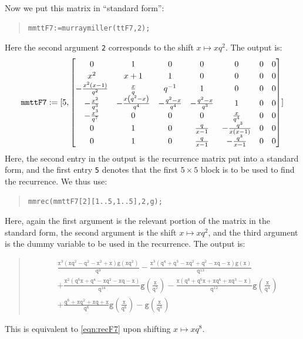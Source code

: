\documentclass[ALCO,Unicode,published]{cedram}
\begin{document}
Now we put this matrix in ``standard form'':
\begin{quote}
\begin{verbatim}
mmttF7:=murraymiller(ttF7,2);
\end{verbatim}
\end{quote}
Here the second argument \texttt{2} corresponds to the shift $x\mapsto xq^2$.
The output is:
\begin{align*}
\mathtt{mmttF7}:=
[5, 
{\renewcommand{\arraystretch}{1.2}
\begin{bmatrix} 
0&1&0&0&0&0&0\\ 
{x}^{2}&x+1&1&0&0&0&0\\ 
-{\frac {{x}^{2} \left( x-1 \right) }{{q}^{2}}}&{\frac {x}{q}}&{q}^{-1}&1&0&0&0\\ 
-{\frac {{x}^{2}}{{q}^{3}}}&-{\frac {x \left( {q}^{2}-x \right) }{{q}^{4}}}&-{\frac {{q}^{2}-x}{{q}^{4}}}&-{\frac {{q}^{2}-x}{{q}^{3}}}&1&0&0\\
-{\frac {{x}^{3}}{{q}^{7}}}&0&0&0&{\frac {x}{{q}^{4}}}&0&0\\ 
0&1&0&{\frac {q}{x-1}}&-{\frac {{q}^{3}}{x \left( x-1 \right) }}&0&0\\
0&1&0&{\frac {q}{x-1}}&-{\frac {{q}^{3}}{x-1}}&0&0
\end{bmatrix}
]
}
\end{align*}
Here, the second entry in the output is the recurrence matrix put into a standard form, 
and the first entry \texttt{5} denotes that the first $5\times 5$ block is 
to be used to find the recurrence.
We thus use:
\begin{quote}
\begin{verbatim}
mmrec(mmttF7[2][1..5,1..5],2,g);
\end{verbatim}
\end{quote}
Here, again the first argument is the relevant portion of the matrix in the standard form, the second argument is the shift $x\mapsto xq^2$,
and the third argument is the dummy variable to be used in the recurrence.
The output is:
\begin{quote}
\begin{align*}
&\mathtt{
{\frac {{x}^{3} \left( x{q}^{2}-{q}^{2}-{x}^{2}+x \right) g \left( x{q
}^{2} \right) }{{q}^{9}}}
-{\frac {{x}^{3} \left( {q}^{4}+{q}^{3}-x{q}^
{2}+{q}^{2}-xq-x \right) g \left( x \right) }{{q}^{13}}}}\\
&\mathtt{+{\frac {{x}^{2} \left( {q}^{5}x+{q}^{4}-x{q}^{2}-xq-x \right) }{{q}^{14}}g \left( {\frac {x}{{q}^{2}}} \right) }
-{\frac {x \left( {q}^{8}+{q}^{5}x+x{q}^{4}+x{q}^{3}-x \right) }{{q}^{12}}g \left( {\frac {x}{{q}^{4}}}\right) }}\\
&\mathtt{+{\frac {{q}^{6}+x{q}^{2}+xq+x}{{q}^{6}}g \left( {\frac {x}{
{q}^{6}}} \right) }-g \left( {\frac {x}{{q}^{8}}} \right) 
}
\end{align*}
\end{quote}
This is equivalent to \eqref{eqn:recF7} upon shifting $x\mapsto xq^8$.
\end{document}
